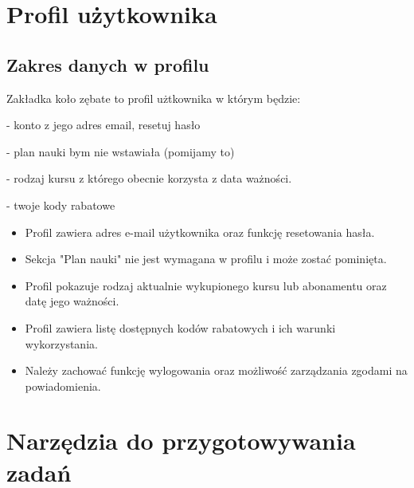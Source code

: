 \documentclass[12pt,a4paper]{report}
\begin{document}
\chapter{Profil użytkownika}
\section{Zakres danych w profilu}
\begin{ElearnReviewComment}[title={Komentarz nr 13 -- Anna Kogut, 2026-07-22}]
Zakładka koło zębate to profil użtkownika w którym będzie:

- konto z jego adres email, resetuj hasło

- plan nauki bym nie wstawiała (pomijamy to)

- rodzaj kursu z którego obecnie korzysta z data ważności.

- twoje kody rabatowe
\end{ElearnReviewComment}
\begin{ElearnRequirement}[title={Wymagania wynikające z komentarza}]
\begin{itemize}
  \item Profil zawiera adres e-mail użytkownika oraz funkcję resetowania hasła.
  \item Sekcja "Plan nauki" nie jest wymagana w profilu i może zostać pominięta.
  \item Profil pokazuje rodzaj aktualnie wykupionego kursu lub abonamentu oraz datę jego ważności.
  \item Profil zawiera listę dostępnych kodów rabatowych i ich warunki wykorzystania.
  \item Należy zachować funkcję wylogowania oraz możliwość zarządzania zgodami na powiadomienia.
\end{itemize}
\end{ElearnRequirement}
\clearpage
\chapter{Narzędzia do przygotowywania zadań}
\end{document}
